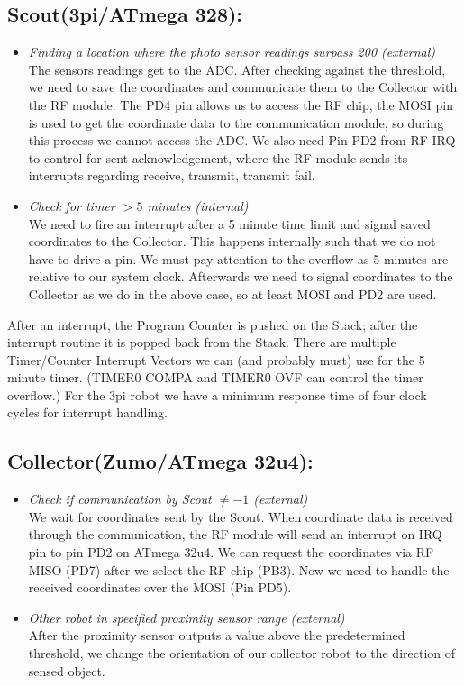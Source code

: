 \documentclass[12pt]{article}
\begin{document}
\subsection*{Scout(3pi/ATmega 328):}
\begin{itemize}
\item \textit{Finding a location where the photo sensor readings surpass 200 (external)}\\
The sensors readings get to the ADC. After checking against the threshold, we need to save the coordinates and communicate them to the Collector with the RF module. The PD4 pin allows us to access the RF chip, the MOSI pin is used to get the coordinate data to the communication module, so during this process we cannot access the ADC. We also need Pin PD2 from RF IRQ to control for sent acknowledgement, where the RF module sends its interrupts regarding receive, transmit, transmit fail.
\item \textit{Check for timer $> 5$ minutes (internal)}\\
We need to fire an interrupt after a 5 minute time limit and signal saved coordinates to the Collector. This happens internally such that we do not have to drive a pin. We must pay attention to the overflow as 5 minutes are relative to our system clock. 
Afterwards we need to signal coordinates to the Collector as we do in the above case, so at least MOSI and PD2 are used.

\end{itemize}
After an interrupt, the Program Counter is pushed on the Stack; after the interrupt routine it is popped back from the Stack.
There are multiple Timer/Counter Interrupt Vectors we can (and probably must) use for the 5 minute timer.
(TIMER0 COMPA and TIMER0 OVF can control the timer overflow.)
For the 3pi robot we have a minimum response time of four clock cycles for interrupt handling. 

\subsection*{Collector(Zumo/ATmega 32u4):}
\begin{itemize}
\item \textit{Check if communication by Scout $\neq -1$ (external)}\\
We wait for coordinates sent by the Scout. When coordinate data is received through the communication, the RF module will send an interrupt on IRQ pin to pin PD2 on ATmega 32u4. We can request the coordinates via RF MISO (PD7) after we select the RF chip (PB3). Now we need to handle the received coordinates over the MOSI (Pin PD5). 
\item \textit{Other robot in specified proximity sensor range (external)}\\
After the proximity sensor outputs a value above the predetermined threshold, we change the orientation of our collector robot to the direction of sensed object. 
\end{itemize} 
\end{document}
